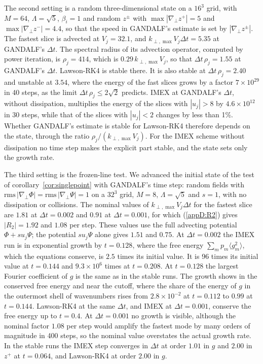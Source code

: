 The second setting is a random three-dimensional state on a $16^3$ grid, with $M=64$, $\Lambda=\sqrt5$, $\beta_i=1$ and random $z^\pm$ with $\max|\nabla_\perp z^+|=5$ and $\max|\nabla_\perp z^-|=4.4$, so that the speed in GANDALF's estimate is set by $|\nabla_\perp z^\pm|$. The fastest slice is advected at $V_j=32.1$, and $k_{\perp,\max}V_j\Delta t=5.35$ at GANDALF's $\Delta t$. The spectral radius of its advection operator, computed by power iteration, is $\rho_j=414$, which is $0.29\,k_{\perp,\max}V_j$, so that $\Delta t\,\rho_j=1.55$ at GANDALF's $\Delta t$. Lawson-RK4 is stable there. It is also stable at $\Delta t\,\rho_j=2.40$ and unstable at $3.54$, where the energy of the fast slices grows by a factor $7\times10^{29}$ in 40 steps, as the limit $\Delta t\,\rho_j\le2\sqrt2$ predicts. IMEX at GANDALF's $\Delta t$, without dissipation, multiplies the energy of the slices with $|u_j|>8$ by $4.6\times10^{12}$ in 30 steps, while that of the slices with $|u_j|<2$ changes by less than 1\%. Whether GANDALF's estimate is stable for Lawson-RK4 therefore depends on the state, through the ratio $\rho_j/(k_{\perp,\max}V_j)$. For the IMEX scheme without dissipation no time step makes the explicit part stable, and the state sets only the growth rate.

The third setting is the frozen-line test. We advanced the initial state of the test of corollary~\ref{cor:singlepoint} with GANDALF's time step: random fields with $\mathrm{rms}\,|\nabla_\perp\Phi|=\mathrm{rms}\,|\nabla_\perp\Psi|=1$ on a $32^3$ grid, $M=8$, $\Lambda=\sqrt5$ and $s=1$, with no dissipation or collisions. The nominal values of $k_{\perp,\max}V_j\Delta t$ for the fastest slice are $1.81$ at $\Delta t=0.002$ and $0.91$ at $\Delta t=0.001$, for which (\ref{appD:R2}) gives $|R_2|=1.92$ and $1.08$ per step. These values use the full advecting potential $\Phi+su_j\Psi$; the potential $su_j\Psi$ alone gives $1.51$ and $0.75$. At $\Delta t=0.002$ the IMEX run is in exponential growth by $t=0.128$, where the free energy $\sum_mp_m\langle g_m^2\rangle$, which the equations conserve, is $2.5$ times its initial value. It is 96 times its initial value at $t=0.144$ and $9.3\times10^6$ times at $t=0.208$. At $t=0.128$ the largest Fourier coefficient of $g$ is the same as in the stable runs. The growth shows in the conserved free energy and near the cutoff, where the share of the energy of $g$ in the outermost shell of wavenumbers rises from $2.8\times10^{-2}$ at $t=0.112$ to $0.99$ at $t=0.144$. Lawson-RK4 at the same $\Delta t$, and IMEX at $\Delta t=0.001$, conserve the free energy up to $t=0.4$. At $\Delta t=0.001$ no growth is visible, although the nominal factor $1.08$ per step would amplify the fastest mode by many orders of magnitude in 400 steps, so the nominal value overstates the actual growth rate. In the stable runs the IMEX step converges in $\Delta t$ at order $1.01$ in $g$ and $2.00$ in $z^+$ at $t=0.064$, and Lawson-RK4 at order $2.00$ in $g$.

